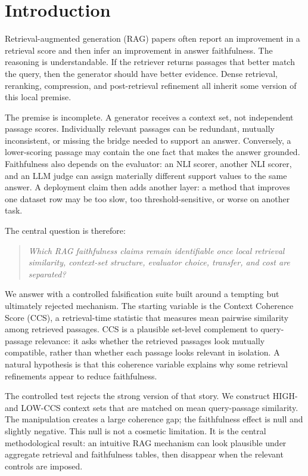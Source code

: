\section{Introduction}

Retrieval-augmented generation (RAG) papers often report an improvement in a
retrieval score and then infer an improvement in answer faithfulness. The
reasoning is understandable. If the retriever returns passages that better
match the query, then the generator should have better evidence. Dense
retrieval, reranking, compression, and post-retrieval refinement all inherit
some version of this local premise.

The premise is incomplete. A generator receives a context set, not independent
passage scores. Individually relevant passages can be redundant, mutually
inconsistent, or missing the bridge needed to support an answer. Conversely, a
lower-scoring passage may contain the one fact that makes the answer grounded.
Faithfulness also depends on the evaluator: an NLI scorer, another NLI scorer,
and an LLM judge can assign materially different support values to the same
answer. A deployment claim then adds another layer: a method that improves one
dataset row may be too slow, too threshold-sensitive, or worse on another task.

The central question is therefore:

\begin{quote}
\emph{Which RAG faithfulness claims remain identifiable once local retrieval
similarity, context-set structure, evaluator choice, transfer, and cost are
separated?}
\end{quote}

We answer with a controlled falsification suite built around a tempting but
ultimately rejected mechanism. The starting variable is the Context Coherence
Score (CCS), a retrieval-time statistic that measures mean pairwise similarity
among retrieved passages. CCS is a plausible set-level complement to
query-passage relevance: it asks whether the retrieved passages look mutually
compatible, rather than whether each passage looks relevant in isolation. A
natural hypothesis is that this coherence variable explains why some retrieval
refinements appear to reduce faithfulness.

The controlled test rejects the strong version of that story. We construct
HIGH- and LOW-CCS context sets that are matched on mean query-passage
similarity. The manipulation creates a large coherence gap; the faithfulness
effect is null and slightly negative. This null is not a cosmetic limitation.
It is the central methodological result: an intuitive RAG mechanism can look
plausible under aggregate retrieval and faithfulness tables, then disappear
when the relevant controls are imposed.

